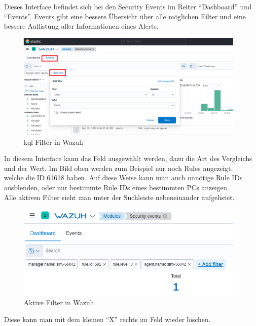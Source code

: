 Dieses Interface befindet sich bei den Security Events im Reiter ``Dashboard'' und ``Events''.
Events gibt eine bessere Übersicht über alle möglichen Filter und eine bessere Auflistung aller Informationen eines Alerts.
\begin{figure}[H]
    \centering
    \includegraphics[width=\linewidth]{../img/filter.png}
    \caption{\acrshort{kql} Filter in Wazuh}
\end{figure}

In diesem Interface kann das Feld ausgewählt werden, dazu die Art des Vergleichs und der Wert.
Im Bild oben werden zum Beispiel nur noch Rules angezeigt, welche die ID 61618 haben.
Auf diese Weise kann man auch unnötige Rule IDs ausblenden, oder nur bestimmte Rule IDs eines bestimmten PCs anzeigen.\\

Alle aktiven Filter sieht man unter der Suchleiste nebeneinander aufgelistet.
\begin{figure}[H]
    \centering
    \includegraphics[width=0.7\linewidth]{../img/aktive-filter.png}
    \caption{Aktive Filter in Wazuh}
\end{figure}
Diese kann man mit dem kleinen ``X'' rechts im Feld wieder löschen.\\

